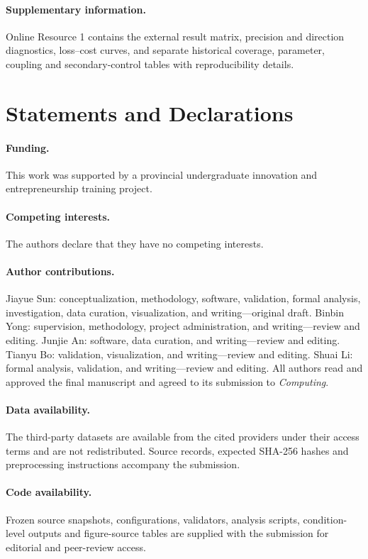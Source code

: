 \documentclass[smallextended]{svjour3}
\begin{document}
\paragraph{Supplementary information.} Online Resource 1 contains the external result matrix, precision and direction diagnostics, loss--cost curves, and separate historical coverage, parameter, coupling and secondary-control tables with reproducibility details.
\section*{Statements and Declarations}
\paragraph{Funding.} This work was supported by a provincial undergraduate innovation and entrepreneurship training project.
\paragraph{Competing interests.} The authors declare that they have no competing interests.
\paragraph{Author contributions.} Jiayue Sun: conceptualization, methodology, software, validation, formal analysis, investigation, data curation, visualization, and writing---original draft. Binbin Yong: supervision, methodology, project administration, and writing---review and editing. Junjie An: software, data curation, and writing---review and editing. Tianyu Bo: validation, visualization, and writing---review and editing. Shuai Li: formal analysis, validation, and writing---review and editing. All authors read and approved the final manuscript and agreed to its submission to \textit{Computing}.
\paragraph{Data availability.} The third-party datasets are available from the cited providers under their access terms and are not redistributed. Source records, expected SHA-256 hashes and preprocessing instructions accompany the submission.
\paragraph{Code availability.} Frozen source snapshots, configurations, validators, analysis scripts, condition-level outputs and figure-source tables are supplied with the submission for editorial and peer-review access.

\end{document}

